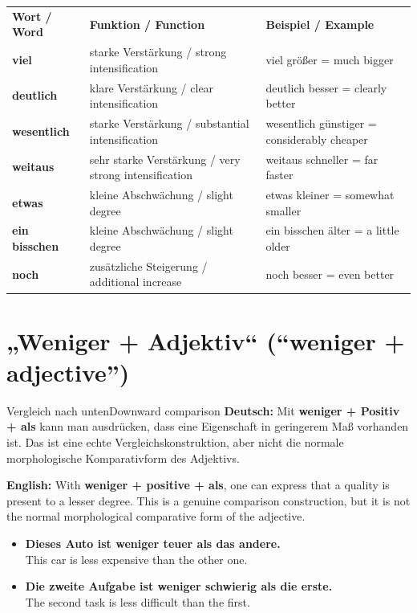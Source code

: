 \documentclass[a4paper,11pt]{article}
\newcommand{\GermanText}[1]{\textbf{Deutsch: }#1\par}
\newcommand{\EnglishText}[1]{{\small\color{SoftGray}\textbf{English: }#1\par}}
\newcommand{\ExampleItem}[2]{\item \textbf{#1}\\{\small\color{SoftGray}#2}}
\begin{document}
      \begin{longtable}{>{\bfseries}p{3.5cm}|p{4.5cm}|p{5.5cm}}
         \rowcolor{HeaderBlueDark}
         \color{white}\textbf{Wort / Word} &
         \color{white}\textbf{Funktion / Function} &
         \color{white}\textbf{Beispiel / Example} \\
         viel & starke Verstärkung / strong intensification & viel größer = much bigger \\
         deutlich & klare Verstärkung / clear intensification & deutlich besser = clearly better \\
         wesentlich & starke Verstärkung / substantial intensification & wesentlich günstiger = considerably cheaper \\
         weitaus & sehr starke Verstärkung / very strong intensification & weitaus schneller = far faster \\
         etwas & kleine Abschwächung / slight degree & etwas kleiner = somewhat smaller \\
         ein bisschen & kleine Abschwächung / slight degree & ein bisschen älter = a little older \\
         noch & zusätzliche Steigerung / additional increase & noch besser = even better \\
      \end{longtable}

   \section{„Weniger + Adjektiv“ \textnormal{(“weniger + adjective”)}}

      \begin{grammarentry}{Vergleich nach unten}{Downward comparison}
         \GermanText{Mit \textbf{weniger + Positiv + als} kann man ausdrücken, dass eine Eigenschaft in geringerem Maß vorhanden ist. Das ist eine echte Vergleichskonstruktion, aber nicht die normale morphologische Komparativform des Adjektivs.}
         \EnglishText{With \textbf{weniger + positive + als}, one can express that a quality is present to a lesser degree. This is a genuine comparison construction, but it is not the normal morphological comparative form of the adjective.}
      \end{grammarentry}

      \begin{exbox}
         \begin{itemize}
            \ExampleItem{Dieses Auto ist weniger teuer als das andere.}{This car is less expensive than the other one.}
            \ExampleItem{Die zweite Aufgabe ist weniger schwierig als die erste.}{The second task is less difficult than the first.}
         \end{itemize}
      \end{exbox}
\end{document}
